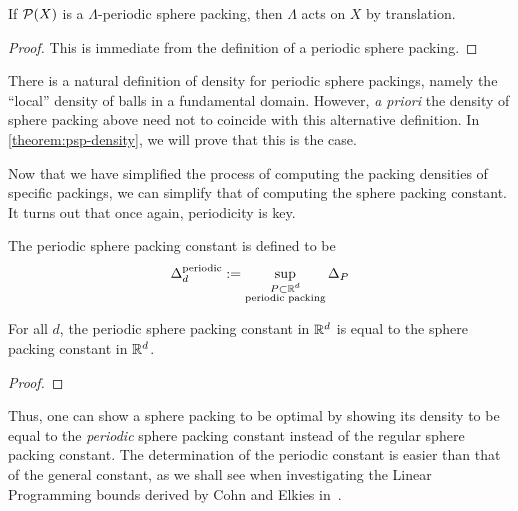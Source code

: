 \begin{lemma}\label{PeriodicSpherePacking.instAddAction}\leanok
  If $\mathcal{P}(X)$ is a $\Lambda$-periodic sphere packing, then $\Lambda$ acts on $X$ by translation.
\end{lemma}
\begin{proof}\leanok
  This is immediate from the definition of a periodic sphere packing.
\end{proof}

There is a natural definition of density for periodic sphere packings, namely the ``local'' density of balls in a fundamental domain. However, \textit{a priori} the density of sphere packing above need not to coincide with this alternative definition. In \cref{theorem:psp-density}, we will prove that this is the case.

Now that we have simplified the process of computing the packing densities of specific packings, we can simplify that of computing the sphere packing constant. It turns out that once again, periodicity is key.

\begin{definition}\label{def:Periodic-sphere-packing-constant}\notready
    The periodic sphere packing constant is defined to be
    $$ \Delta_{d}^{\text{periodic}} := \sup_{\substack{P \subset \mathbb{R}^d \\ \text{periodic packing}}} \Delta_P$$
\end{definition}

\begin{theorem}\label{periodic-packing-optimal}\notready
    For all $d$, the periodic sphere packing constant in $\mathbb{R}^d$ is equal to the sphere packing constant in $\mathbb{R}^d$.
\end{theorem}
\begin{proof}
\end{proof}

Thus, one can show a sphere packing to be optimal by showing its density to be equal to the \emph{periodic} sphere packing constant instead of the regular sphere packing constant. The determination of the periodic constant is easier than that of the general constant, as we shall see when investigating the Linear Programming bounds derived by Cohn and Elkies in~\cite{ElkiesCohn}.
